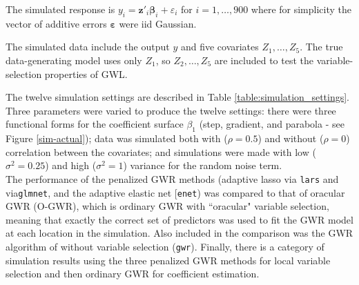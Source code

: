 \documentclass[authoryear, review, 11pt]{elsarticle}
\begin{document}
	The simulated response is $y_i = \bm{z}'_i \bm{\beta}_i + \varepsilon_i$ for $i=1, \dots, 900$ where for simplicity the vector of additive errors $\bm{\varepsilon}$ were iid Gaussian.%
	
	The simulated data include the output $y$ and five covariates $Z_1, \dots, Z_5$. The true data-generating model uses only $Z_1$, so $Z_2, \dots, Z_5$ are included to test the variable-selection properties of GWL.
	
	The twelve simulation settings are described in Table \ref{table:simulation_settings}. Three parameters were varied to produce the twelve settings: there were three functional forms for the coefficient surface $\beta_1$ (step, gradient, and parabola - see Figure \ref{sim-actual}); data was simulated both with ($\rho = 0.5$) and without ($\rho = 0$) correlation between the covariates; and simulations were made with low ($\sigma^2 = 0.25$) and high ($\sigma^2 = 1$) variance for the random noise term.\\
	
	The performance of the penalized GWR methods (adaptive lasso via \verb!lars! and via\verb!glmnet!, and the adaptive elastic net [\verb!enet!) was compared to that of oracular GWR (O-GWR), which is ordinary GWR with ``oracular" variable selection, meaning that exactly the correct set of predictors was used to fit the GWR model at each location in the simulation. Also included in the comparison was the GWR algorithm of \cite{Fotheringham:2002} without variable selection (\verb!gwr!). Finally, there is a category of simulation results using the three penalized GWR methods for local variable selection and then ordinary GWR for coefficient estimation.\\
	
\end{document}

